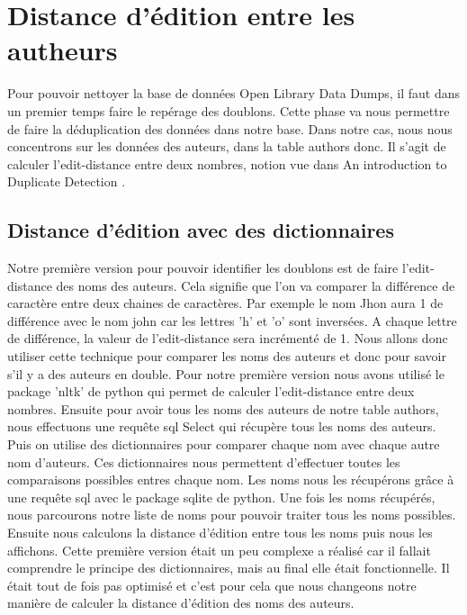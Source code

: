 \documentclass[12pt, a4paper]{article}
\begin{document}
\section{Distance d'édition entre les autheurs}

Pour pouvoir nettoyer la base de données Open Library Data Dumps, il faut dans un premier temps faire le repérage des doublons. Cette phase va nous permettre de faire la déduplication des données dans notre base. Dans notre cas, nous nous concentrons sur les données des auteurs, dans la table authors donc. Il s'agit de calculer l'edit-distance entre deux nombres, notion vue dans  An introduction to Duplicate Detection \cite{10.5555/1841211}.

\subsection{Distance d'édition avec des dictionnaires}
Notre première version pour pouvoir identifier les doublons est de faire l'edit-distance des noms des auteurs. Cela signifie que l'on va comparer la différence de caractère entre deux chaines de caractères. Par exemple le nom Jhon aura 1 de différence avec le nom john car les lettres 'h' et 'o' sont inversées. A chaque lettre de différence, la valeur de l'edit-distance sera incrémenté de 1. Nous allons donc utiliser cette technique pour comparer les noms des auteurs et donc pour savoir s'il y a des auteurs en double. Pour notre première version nous avons utilisé le package 'nltk' de python qui permet de calculer l'edit-distance entre deux nombres. Ensuite pour avoir tous les noms des auteurs de notre table authors, nous effectuons une requête sql Select qui récupère tous les noms des auteurs. Puis on utilise des dictionnaires pour comparer chaque nom avec chaque autre nom d'auteurs. Ces dictionnaires nous permettent d'effectuer toutes les comparaisons possibles entres chaque nom. Les noms nous les récupérons grâce à une requête sql avec le package sqlite de python. Une fois les noms récupérés, nous parcourons notre liste de noms pour pouvoir traiter tous les noms possibles. Ensuite nous calculons la distance d'édition entre tous les noms puis nous les affichons. Cette première version était un peu complexe a réalisé car il fallait comprendre le principe des dictionnaires, mais au final elle était fonctionnelle. Il était tout de fois pas optimisé et c'est pour cela que nous changeons notre manière de calculer la distance d'édition des noms des auteurs.
\end{document}
